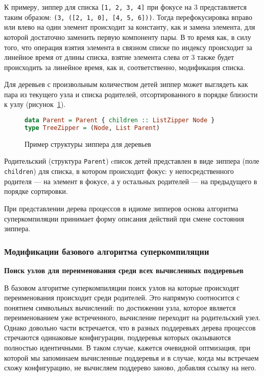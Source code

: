К примеру, зиппер для списка \lstinline{[1, 2, 3, 4]} при фокусе на 3 представляется
таким образом: \lstinline{(3, ([2, 1, 0], [4, 5, 6]))}.
Тогда перефокусировка вправо или влево на один элемент происходит за константу,
как и замена элемента, для которой достаточно заменить первую компоненту пары.
В то время как, в силу того, что операция взятия элемента в связном списке по индексу
происходит за линейное время от длины списка, взятие элемента слева от 3 также
будет происходить за линейное время, как и, соответственно, модификация списка.

Для деревьев с произвольным количеством детей зиппер может выглядеть
как пара из текущего узла и списка родителей, отсортированного в порядке
близости к узлу (рисунок~\ref{fig:zipper}). 
\begin{figure}[h!]
\begin{lstlisting}[mathescape,language=Haskell,extendedchars=\true,frame=single,basicstyle=\ttfamily]
data Parent = Parent { children :: ListZipper Node }
type TreeZipper = (Node, List Parent)
\end{lstlisting}
\caption{Пример структуры зиппера для деревьев}
\label{fig:zipper}
\end{figure}

Родительский (структура \lstinline{Parent}) cписок детей представлен в виде зиппера (поле \lstinline{children})
для списка, в котором происходит фокус: у непосредственного родителя --- на элемент в фокусе, а у остальных
родителей --- на предыдущего в порядке сортировки.

При представлении дерева процессов в идиоме зипперов основа алгоритма суперкомпиляции
принимает форму описания действий при смене состояния зиппера.

\subsubsection{Модификации базового алгоритма суперкомпиляции}

\textbf{Поиск узлов для переименования среди всех вычисленных поддеревьев}

В базовом алгоритме суперкомпиляции поиск узлов на которые происходят переименования происходит
среди родителей. Это напрямую соотносится с понятием символьных вычислений: по достижении
узла, которое является переименованием уже встреченного, вычисление переходит на родительский узел.
Однако довольно части встречается, что в разных поддеревьях дерева процессов стречаются одинаковые
конфигурации, поддеревья которых оказываются полностью идентичными. В таком случае, кажется
очевидной оптмизация, при которой мы запоминаем вычисленные поддеревья и в случае,
когда мы встречаем схожу конфигурацию, не вычисляем поддерево заново, добавляя ссылку на него.

